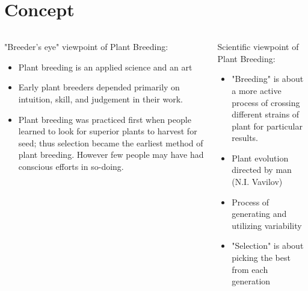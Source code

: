 \documentclass[11pt,ignorenonframetext,aspectratio=169]{beamer}
\begin{document}
\hypertarget{concept}{%
\section{Concept}\label{concept}}

\begin{frame}{}
\protect\hypertarget{section-4}{}
\begin{columns}[T,onlytextwidth]
\begin{column}{0.5\textwidth}
"Breeder's eye" viewpoint of Plant Breeding: 
\begin{itemize}
\item Plant breeding is an applied science and an art 
\item Early plant breeders depended primarily on intuition, skill, and judgement in their work.
\item Plant breeding was practiced first when people learned to look for superior plants to harvest for seed; thus selection became the earliest method of plant breeding. However few people may have had conscious efforts in so-doing.
\end{itemize}
\end{column}
\begin{column}{0.5\textwidth}  %
Scientific viewpoint of Plant Breeding: 
\begin{itemize}
\item "Breeding" is about a more active process of crossing different strains of plant for particular results.
\item Plant evolution directed by man (N.I. Vavilov)
\item Process of generating and utilizing variability
\item "Selection" is about picking the best from each generation
\end{itemize}
\end{column}
\end{columns}
\end{frame}
\end{document}
